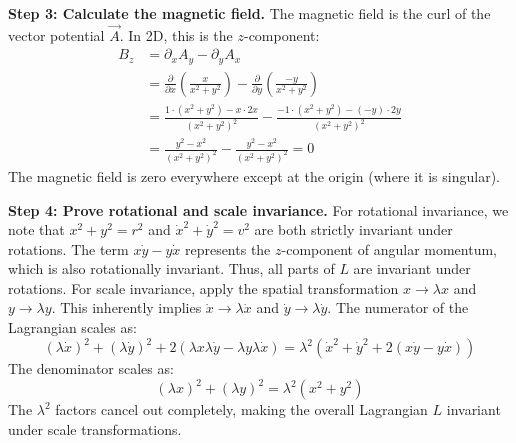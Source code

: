 \begin{solution}
\textbf{Step 3: Calculate the magnetic field.}
The magnetic field is the curl of the vector potential $\vec{A}$. In 2D, this is the $z$-component:
\begin{align*}
    B_z &= \partial_x A_y - \partial_y A_x \\
        &= \frac{\partial}{\partial x} \left( \frac{x}{x^2+y^2} \right) - \frac{\partial}{\partial y} \left( \frac{-y}{x^2+y^2} \right) \\
        &= \frac{1 \cdot (x^2+y^2) - x \cdot 2x}{(x^2+y^2)^2} - \frac{-1 \cdot (x^2+y^2) - (-y) \cdot 2y}{(x^2+y^2)^2} \\
        &= \frac{y^2-x^2}{(x^2+y^2)^2} - \frac{y^2-x^2}{(x^2+y^2)^2} = 0
\end{align*}
The magnetic field is zero everywhere except at the origin (where it is singular).

\textbf{Step 4: Prove rotational and scale invariance.}
For rotational invariance, we note that $x^2+y^2 = r^2$ and $\dot{x}^2+\dot{y}^2 = v^2$ are both strictly invariant under rotations. The term $x\dot{y} - y\dot{x}$ represents the $z$-component of angular momentum, which is also rotationally invariant. Thus, all parts of $L$ are invariant under rotations.
For scale invariance, apply the spatial transformation $x \to \lambda x$ and $y \to \lambda y$. This inherently implies $\dot{x} \to \lambda \dot{x}$ and $\dot{y} \to \lambda \dot{y}$.
The numerator of the Lagrangian scales as:
\begin{equation*}
    (\lambda \dot{x})^2 + (\lambda \dot{y})^2 + 2(\lambda x \lambda \dot{y} - \lambda y \lambda \dot{x}) = \lambda^2 \left( \dot{x}^2 + \dot{y}^2 + 2(x\dot{y}-y\dot{x}) \right)
\end{equation*}
The denominator scales as:
\begin{equation*}
    (\lambda x)^2 + (\lambda y)^2 = \lambda^2 (x^2+y^2)
\end{equation*}
The $\lambda^2$ factors cancel out completely, making the overall Lagrangian $L$ invariant under scale transformations.


\end{solution}
